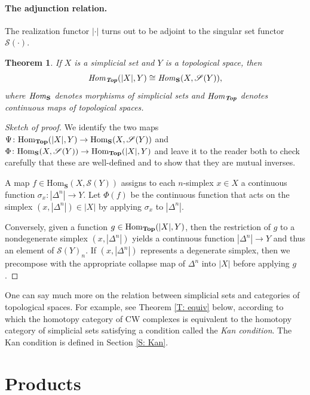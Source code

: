 \documentclass[12pt]{article}
\theoremstyle{plain}
\newtheorem{theorem}{Theorem}[section]
\theoremstyle{definition}
\theoremstyle{remark}
\newcommand{\mbf}[1]{\mathbf{#1}}
\newcommand{\ms}[1]{\mathscr{#1}}
\newcommand{\Hom}{\text{Hom}}
\newcommand{\Top}{\text{\textbf{Top}}}
\begin{document}
\paragraph{The adjunction relation.}

The realization functor $|\cdot|$ turns out to be adjoint to the singular set functor $\ms S(\cdot )$. 

\begin{theorem}\label{T: adjoint}
If $X$ is a simplicial set and $Y$ is a topological space, then $$\text{\emph{Hom}}_{\textbf{\emph{Top}}}(|X|,Y)\cong \text{\emph{Hom}}_{\mbf S}(X,\ms S(Y)),$$
where $\text{\emph{Hom}}_{\mbf S}$ denotes morphisms of simplicial sets and $\text{\emph{Hom}}_{\textbf{\emph{Top}}}$ denotes continuous maps of topological spaces.  
\end{theorem}
\begin{proof}[Sketch of proof]
We identify the two maps $\Psi\colon\Hom_{\Top}(|X|,Y)\to \Hom_{\mbf S}(X,\ms S(Y)) $ and $\Phi\colon\Hom_{\mbf S}(X,\ms S(Y))\to \Hom_{\Top}(|X|,Y)$ and leave it to the reader both to check carefully that these are well-defined and to show that they are mutual inverses.

A map $f\in \Hom_{\mbf S}(X,\ms S(Y))$ assigns to each $n$-simplex  $x\in X$ a continuous function $\sigma_x\colon |\Delta^n|\to Y$. Let $\Phi(f)$ be the continuous function that acts on the simplex $(x,|\Delta^n|)\in |X|$ by applying $\sigma_x$ to $|\Delta^n|$. 

Conversely, given a function $g\in \Hom_{\Top}(|X|,Y)$, then the restriction of $g$ to a nondegenerate simplex $(x, |\Delta^n|)$  yields a continuous function $|\Delta^n|\to Y$ and thus an element of $\ms S(Y)_n$. If $(x,| \Delta^n|)$ represents a degenerate simplex, then we precompose with the appropriate collapse map of $\Delta^n$ into $|X|$  before applying $g$. 
\end{proof}



One can say much more on the relation between simplicial sets and categories of topological spaces. For example, see Theorem \ref{T: equiv} below, according to which the homotopy category of CW complexes is equivalent to the homotopy category of simplicial sets satisfying a condition called the \emph{Kan condition}. The Kan condition is defined in Section \ref{S: Kan}.




\section{Products}\label{S: product}
\end{document}
